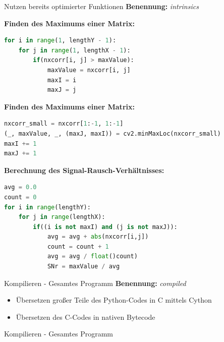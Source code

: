 \begin{frame}{Nutzen bereits optimierter Funktionen}
	\textbf{Benennung:} \textit{intrinsics}
	
	\textbf{Finden des Maximums einer Matrix:}
	\begin{lstlisting}[language=Python]
for i in range(1, lengthY - 1):
	for j in range(1, lengthX - 1):
		if(nxcorr[i, j] > maxValue):
			maxValue = nxcorr[i, j]
			maxI = i
			maxJ = j
	\end{lstlisting}
	
	\framebreak
	
	\textbf{Finden des Maximums einer Matrix:}
	\begin{lstlisting}[language=Python]
nxcorr_small = nxcorr[1:-1, 1:-1]
(_, maxValue, _, (maxJ, maxI)) = cv2.minMaxLoc(nxcorr_small)
maxI += 1
maxJ += 1
	\end{lstlisting}
	
	\framebreak
	
	\textbf{Berechnung des Signal-Rausch-Verhältnisses:}
	\begin{lstlisting}[language=Python]
avg = 0.0
count = 0
for i in range(lengthY):
	for j in range(lengthX):
		if((i is not maxI) and (j is not maxJ)):
			avg = avg + abs(nxcorr[i,j])
			count = count + 1
			avg = avg / float()count)
			SNr = maxValue / avg
	\end{lstlisting}
\end{frame}

\begin{frame}{Kompilieren - Gesamtes Programm}
	\textbf{Benennung:} \textit{compiled}
	\begin{itemize}
		\item Übersetzen großer Teile des Python-Codes in C mittels Cython
		\item Übersetzen des C-Codes in nativen Bytecode
	\end{itemize}
\end{frame}

\begin{frame}{Kompilieren - Gesamtes Programm}
	\centering
\end{frame}

